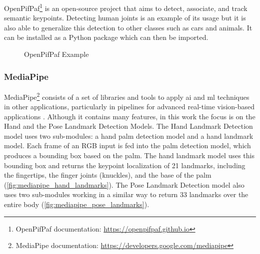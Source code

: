 OpenPifPaf\cite{Kreiss2021,Kreiss2019}\footnote{OpenPifPaf documentation: \url{https://openpifpaf.github.io}} is an open-source project that aims to detect, associate, and track semantic keypoints. Detecting human joints is an example of its usage but it is also able to generalize this detection to other classes such as cars and animals. It can be installed as a Python package which can then be imported.

\begin{figure}[ht]
    \centering
    \caption[OpenPifPaf Example]{OpenPifPaf Example \cite{Kreiss2021}}
    \label{fig:openpifpaf}
\end{figure}

\subsubsection{MediaPipe}


MediaPipe\footnote{MediaPipe documentation: \url{https://developers.google.com/mediapipe}} consists of a set of libraries and tools to apply \acs{ai} and \acs{ml} techniques in other applications, particularly in pipelines for advanced real-time vision-based applications \cite{Lugaresi2019}. Although it contains many features, in this work the focus is on the Hand and the Pose Landmark Detection Models.
The Hand Landmark Detection model \cite{Zhang2020} uses two sub-modules: a hand palm detection model and a hand landmark model. Each frame of an RGB input is fed into the palm detection model, which produces a bounding box based on the palm. The hand landmark model uses this bounding box and returns the keypoint localization of 21 landmarks, including the fingertips, the finger joints (knuckles), and the base of the palm (\autoref{fig:mediapipe_hand_landmarks}). The Pose Landmark Detection model also uses two sub-modules working in a similar way to return 33 landmarks over the entire body (\autoref{fig:mediapipe_pose_landmarks}). %


